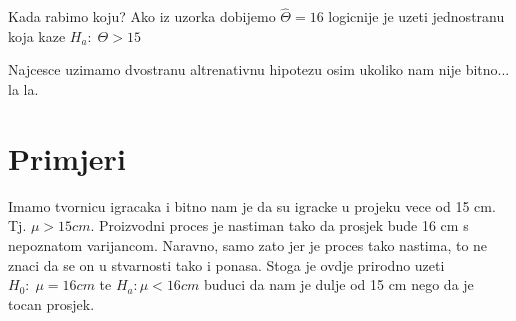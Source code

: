Kada rabimo koju? Ako iz uzorka dobijemo $\hat{\Theta} = 16$ logicnije je uzeti jednostranu koja kaze $H_a: \; \Theta > 15$


Najcesce uzimamo dvostranu altrenativnu hipotezu osim ukoliko nam nije bitno... la la.

\section{Primjeri}
Imamo tvornicu igracaka i bitno nam je da su igracke u projeku vece od 15 cm. Tj. $\mu > 15cm$. Proizvodni proces je nastiman tako da prosjek bude 16 cm s nepoznatom varijancom. Naravno, samo zato jer je proces tako nastima, to ne znaci da se on u stvarnosti tako i ponasa. Stoga je ovdje prirodno uzeti $H_0:\; \mu = 16cm$ te $H_a: \mu < 16cm$ buduci da nam je dulje od 15 cm nego da je tocan prosjek.

